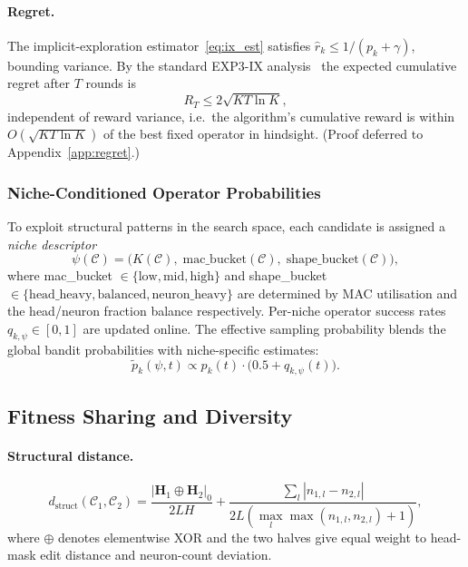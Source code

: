 \documentclass{article}
\newcommand{\Hb}{\mathbf{H}}
\newcommand{\Cc}{\mathcal{C}}
\newcommand{\dstruct}{d_{\mathrm{struct}}}
\begin{document}
\paragraph{Regret.}  The implicit-exploration estimator~\eqref{eq:ix_est}
satisfies $\hat r_k\le 1/(p_k+\gamma)$, bounding variance.  By the
standard EXP3-IX analysis~\citep{neu2015explore} the expected cumulative
regret after $T$ rounds is
\begin{equation}
  R_T \le 2\sqrt{KT\ln K},
  \label{eq:regret}
\end{equation}
independent of reward variance, i.e.\ the algorithm's cumulative reward
is within $O(\sqrt{KT\ln K})$ of the best fixed operator in hindsight.
(Proof deferred to Appendix~\ref{app:regret}.)

\subsubsection{Niche-Conditioned Operator Probabilities}

To exploit structural patterns in the search space, each candidate is
assigned a \emph{niche descriptor}
\begin{equation}
  \psi(\Cc) = \bigl(K(\Cc),\; \mathrm{mac\_bucket}(\Cc),\;
               \mathrm{shape\_bucket}(\Cc)\bigr),
\end{equation}
where mac\_bucket $\in \{\text{low},\text{mid},\text{high}\}$ and
shape\_bucket $\in \{\text{head\_heavy},\text{balanced},
\text{neuron\_heavy}\}$ are determined by MAC utilisation and the
head/neuron fraction balance respectively.  Per-niche operator success
rates $q_{k,\psi}\in[0,1]$ are updated online.  The effective sampling
probability blends the global bandit probabilities with niche-specific
estimates:
\begin{equation}
  \tilde{p}_k(\psi,t)
  \propto p_k(t)\cdot\bigl(0.5 + q_{k,\psi}(t)\bigr).
  \label{eq:niche_blend}
\end{equation}

\subsection{Fitness Sharing and Diversity}
\label{sec:sharing}

\paragraph{Structural distance.}
\begin{equation}
  \dstruct(\Cc_1,\Cc_2)
  = \frac{|\Hb_1\oplus\Hb_2|_0}{2LH}
  + \frac{\sum_l|n_{1,l}-n_{2,l}|}{2L(\max_{l}\max(n_{1,l},n_{2,l})+1)},
  \label{eq:dstruct}
\end{equation}
where $\oplus$ denotes elementwise XOR and the two halves give equal
weight to head-mask edit distance and neuron-count deviation.
\end{document}

